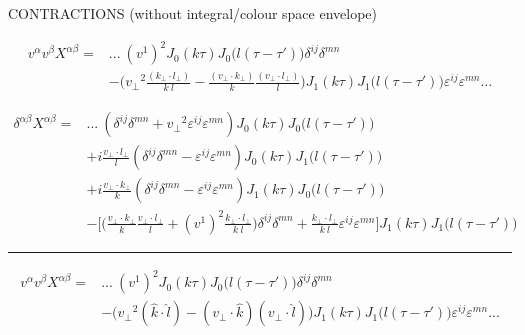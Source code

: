 \documentclass[12pt]{article}
\begin{document}
\newpage

CONTRACTIONS (without integral/colour space envelope)

\begin{equation*}
\begin{split}
v^\alpha v^\beta X^{\alpha \beta} = & ...~ (v^1)^2 J_0 (k \tau) J_0\big(l(\tau-\tau')\big) \delta^{ij} \delta^{mn} \\
& - \Big( {v_\perp}^2 \frac{(k_\perp \cdot l_\perp)}{k ~l} - \frac{(v_\perp \cdot k_\perp)}{k}\frac{(v_\perp \cdot l_\perp)}{l}\Big) J_1 (k \tau) J_1\big(l(\tau-\tau')\big) \varepsilon^{ij} \varepsilon^{mn} ...
\end{split}
\end{equation*}

\begin{equation*}
\begin{split}
\delta^{\alpha \beta} X^{\alpha \beta}=& ...~ (\delta^{ij} \delta^{mn} + {v_\perp}^2 \varepsilon^{ij} \varepsilon^{mn}) J_0 (k \tau) J_0\big(l(\tau-\tau')\big) \\
& + i \frac{v_\perp \cdot l_\perp}{l} (\delta^{ij} \delta^{mn} - \varepsilon^{ij} \varepsilon^{mn}) J_0 (k \tau) J_1\big(l(\tau-\tau')\big) \\
& + i \frac{v_\perp \cdot k_\perp}{k} (\delta^{ij} \delta^{mn} - \varepsilon^{ij} \varepsilon^{mn}) J_1 (k \tau) J_0\big(l(\tau-\tau')\big) \\
& - \bigg[ \Big(\frac{v_\perp \cdot k_\perp}{k} \frac{v_\perp \cdot l_\perp}{l} + (v^1)^2 \frac{k_\perp \cdot l_\perp}{k~l} \Big) \delta^{ij} \delta^{mn} + \frac{k_\perp \cdot l_\perp}{k ~l} \varepsilon^{ij}\varepsilon^{mn} \bigg] J_1 (k \tau) J_1\big(l(\tau-\tau')\big) \end{split}
\end{equation*}

\hrule

\begin{equation*}
\begin{split}
v^\alpha v^\beta X^{\alpha \beta} = & ...~ (v^1)^2 J_0 (k \tau) J_0\big(l(\tau-\tau')\big) \delta^{ij} \delta^{mn} \\
& - \Big( {v_\perp}^2 (\hat{k} \cdot \hat{l}) - (v_\perp \cdot \hat{k})(v_\perp \cdot \hat{l})\Big) J_1 (k \tau) J_1\big(l(\tau-\tau')\big) \varepsilon^{ij} \varepsilon^{mn} ...
\end{split}
\end{equation*}
\end{document}
